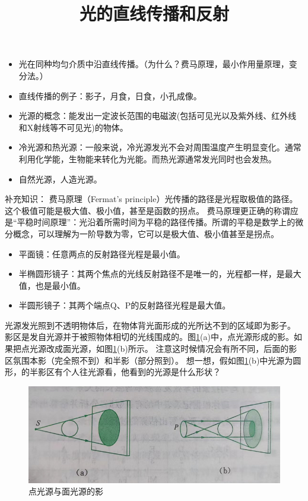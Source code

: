 \documentclass[windows,csize4]{BHCexam}
\title{光的直线传播和反射}
\begin{document}
\maketitle

\begin{groups}
    \begin{itemize}
        \item 光在同种均匀介质中沿直线传播。（为什么？费马原理，最小作用量原理，变分法。）
        \item 直线传播的例子：影子，月食，日食，小孔成像。
        \item 光源的概念：能发出一定波长范围的电磁波(包括可见光以及紫外线、红外线和X射线等不可见光)的物体。
        \item 冷光源和热光源：一般来说，冷光源发光不会对周围温度产生明显变化。通常利用化学能，生物能来转化为光能。而热光源通常发光同时也会发热。
        \item 自然光源，人造光源。
    \end{itemize}

    补充知识： 费马原理（Fermat's principle）光传播的路径是光程取极值的路径。这个极值可能是极大值、极小值，甚至是函数的拐点。
    费马原理更正确的称谓应是“平稳时间原理”：光沿着所需时间为平稳的路径传播。所谓的平稳是数学上的微分概念，可以理解为一阶导数为零，它可以是极大值、极小值甚至是拐点。
    \begin{itemize}
        \item 平面镜：任意两点的反射路径光程是最小值。
        \item 半椭圆形镜子：其两个焦点的光线反射路径不是唯一的，光程都一样，是最大值，也是最小值。
        \item 半圆形镜子：其两个端点Q、P的反射路径光程是最大值。
    \end{itemize}

    光源发光照到不透明物体后，在物体背光面形成的光所达不到的区域即为影子。
    影区是发自光源并于被照物体相切的光线围成的。图\ref{fig:fig_3_1}(a)中，点光源形成的影。如果把点光源改成面光源，如图\ref{fig:fig_3_1}(b)所示。
    注意这时候情况会有所不同，后面的影区氛围本影（完全照不到）和半影（部分照到）。
    想一想，假如图\ref{fig:fig_3_1}(b)中光源为圆形，的半影区有个人往光源看，他看到的光源是什么形状？
    \begin{figure}[htb]
        \centering
        \includegraphics [scale=0.75,trim=0 0 0 0]{./image/fig_3_1.PNG}
        \caption{点光源与面光源的影}
        \label{fig:fig_3_1}
    \end{figure}


\end{groups}
\end{document}
